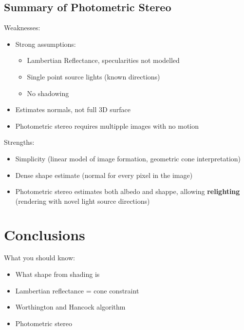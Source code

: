 \documentclass{article}
\begin{document}
\subsection{Summary of Photometric Stereo}
Weaknesses:
\begin{itemize}
	\item Strong assumptions:
		\begin{itemize}
			\item Lambertian Reflectance, specularities not modelled
			\item Single point source lights (known directions)
			\item No shadowing
		\end{itemize}
	\item Estimates normals, not full 3D surface
	\item Photometric stereo requires multipple images with no motion
\end{itemize}
Strengths:
\begin{itemize}
	\item Simplicity (linear model of image formation, geometric cone interpretation)
	\item Dense shape estimate (normal for every pixel in the image)
	\item Photometric stereo estimates both albedo and shappe, allowing \textbf{relighting} (rendering with novel light source directions)
\end{itemize}

\section{Conclusions}
What you should know:
\begin{itemize}
	\item What shape from shading is
	\item Lambertian reflectance = cone constraint
	\item Worthington and Hancock algorithm
	\item Photometric stereo
\end{itemize}
\end{document}
